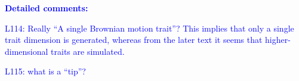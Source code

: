 \documentclass[
]{article}
\begin{document}

\textcolor{blue}{\textbf{Detailed comments:}}

\textcolor{blue}{L114: Really ``A single Brownian motion trait''? This implies that only a single trait dimension is generated, whereas from the later text it seems that higher-dimensional traits are simulated.}

\textcolor{blue}{L115: what is a ``tip''?}
\end{document}
